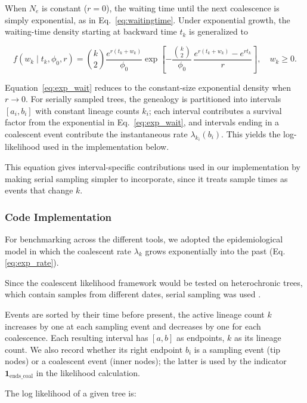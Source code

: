 \documentclass[11pt, a4paper]{article}
\begin{document}
When \(N_e\) is constant (\(r=0\)), the waiting time until the next coalescence is simply exponential, as in Eq.~\eqref{eq:waitingtime}. Under exponential growth, the waiting-time density starting at backward time $t_k$ is generalized to

\begin{equation}
f(w_k\mid t_k,\phi_0,r)
=
\binom{k}{2}\frac{e^{r(t_k+w_k)}}{\phi_0}
\exp\!\left[
-\frac{\binom{k}{2}}{\phi_0}\,
\frac{e^{r(t_k+w_k)}-e^{rt_k}}{r}
\right],
\quad w_k\ge 0.
\label{eq:exp_wait}
\end{equation}

Equation~\eqref{eq:exp_wait} reduces to the constant-size exponential density when \(r\to 0\). For serially sampled trees, the genealogy is partitioned into intervals \([a_i,b_i]\) with constant lineage counts \(k_i\); each interval contributes a survival factor from the exponential in Eq.~\eqref{eq:exp_wait}, and intervals ending in a coalescent event contribute the instantaneous rate \(\lambda_{k_i}(b_i)\). This yields the log-likelihood used in the implementation below.

This equation gives interval-specific contributions used in our implementation by making serial sampling simpler to incorporate, since it treats sample times as events that change $k$.

\subsubsection{Code Implementation}
For benchmarking across the different tools, we adopted the epidemiological model in which the coalescent rate $\lambda_k$ grows exponentially into the past (Eq. \ref{eq:exp_rate}).

Since the coalescent likelihood framework would be tested on heterochronic trees, which contain samples from different dates, serial sampling was used \cite{drummond2002}. 

Events are sorted by their time before present, the active lineage count $k$ increases by one at each sampling event and decreases by one for each coalescence. Each resulting interval has $[a,b]$ as endpoints, $k$ as its lineage count. We also record whether its right endpoint $b_i$ is a sampling event (tip nodes) or a coalescent event (inner nodes); the latter is used by the indicator $\mathbf{1}_{\text{ends\_coal}}$ in the likelihood calculation.

The log likelihood of a given tree is:
\end{document}
